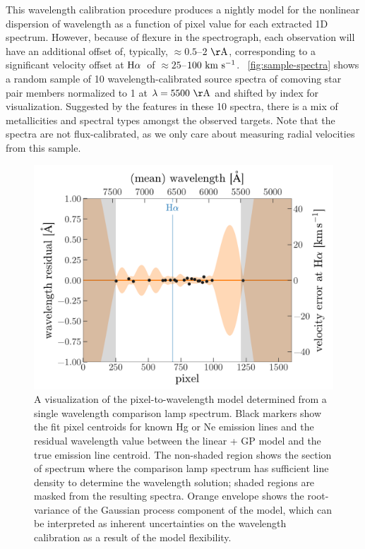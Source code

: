 \documentclass[modern, letterpaper]{aastex61}
\newcommand{\Ha}{\ensuremath{{\rm H}\alpha}}
\begin{document}
This wavelength calibration procedure produces a nightly model for the
nonlinear dispersion of wavelength as a function of pixel value for each
extracted 1D spectrum.
However, because of flexure in the spectrograph, each observation will have an
additional offset of, typically, $\approx 0.5$--$2~{\rm \AA}$, corresponding to
a significant velocity offset at \Ha\ of $\approx 25$--$100~\mathrm{km}~\mathrm{s}^{-1}$.
\figurename~\ref{fig:sample-spectra} shows a random sample of 10
wavelength-calibrated source spectra of comoving star pair members normalized
to 1 at $\lambda = 5500~{\rm \AA}$ and shifted by index for visualization.
Suggested by the features in these 10 spectra, there is a mix of metallicities
and spectral types amongst the observed targets.
Note that the spectra are not flux-calibrated, as we only care about measuring
radial velocities from this sample.

\begin{figure}[htbp]
  \begin{center}
    \includegraphics[width=\linewidth]{wavelength_gp.pdf}
  \end{center}
  \caption{%
    A visualization of the pixel-to-wavelength model determined from a single
    wavelength comparison lamp spectrum.
    Black markers show the fit pixel centroids for known Hg or Ne emission
    lines and the residual wavelength value between the linear + GP model and
    the true emission line centroid.
    The non-shaded region shows the section of spectrum where the comparison
    lamp spectrum has sufficient line density to determine the wavelength
    solution; shaded regions are masked from the resulting spectra.
    Orange envelope shows the root-variance of the Gaussian process component
    of the model, which can be interpreted as inherent uncertainties on the
    wavelength calibration as a result of the model flexibility.
    \label{fig:wavelength-GP}}
\end{figure}
\end{document}
